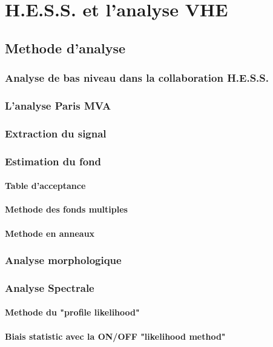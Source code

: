 \documentclass[12pt]{report}
\begin{document}
\chapter{H.E.S.S. et l'analyse VHE}
\section{Methode d'analyse}
\subsection{Analyse de bas niveau dans la collaboration H.E.S.S.}

\subsection{L'analyse Paris MVA}

\subsection{Extraction du signal}

\subsection{Estimation du fond}
\subsubsection{Table d'acceptance}
\subsubsection{Methode des fonds multiples}
\subsubsection{Methode en anneaux}

\subsection{Analyse morphologique}

\subsection{Analyse Spectrale}
\subsubsection{Methode du "profile likelihood"}
\subsubsection{Biais statistic avec la ON/OFF "likelihood method"}
\end{document}
